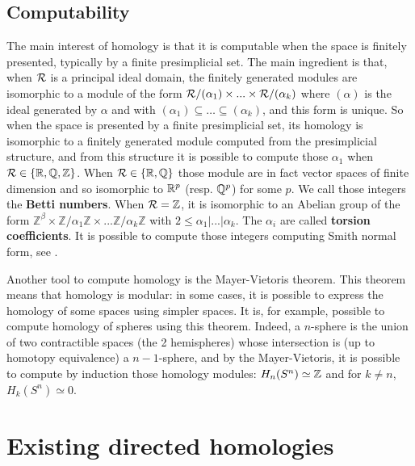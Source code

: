 \subsection{Computability}
\label{subsec:homcom}

The main interest of homology is that it is computable when the space is finitely presented, typically by a finite presimplicial set. The main ingredient is that, when $\mathcal{R}$ is a principal ideal domain, the finitely generated modules are isomorphic to a module of the form $\mathcal{R}/(\alpha_1)\times ... \times\mathcal{R}/(\alpha_k)$ where $(\alpha)$ is the ideal generated by $\alpha$ and with $(\alpha_1) \subseteq \ldots \subseteq (\alpha_k)$, and this form is unique. So when the space is presented by a finite presimplicial set, its homology is isomorphic to a finitely generated module computed from the presimplicial structure, and from this structure it is possible to compute those $\alpha_1$ when $\mathcal{R} \in \{\mathbb{R},\mathbb{Q},\mathbb{Z}\}$. When $\mathcal{R} \in \{\mathbb{R},\mathbb{Q}\}$ those module are in fact vector spaces of finite dimension and so isomorphic to $\mathbb{R}^p$ (resp. $\mathbb{Q}^p$) for some $p$. We call those integers the \textbf{Betti numbers}. When $\mathcal{R} = \mathbb{Z}$, it is isomorphic to an Abelian group of the form $\mathbb{Z}^\beta\times\mathbb{Z}/\alpha_1\mathbb{Z}\times ... \mathbb{Z}/\alpha_k\mathbb{Z}$ with $2 \leq \alpha_1|...|\alpha_k$. The $\alpha_i$ are called \textbf{torsion coefficients}. It is possible to compute those integers computing Smith normal form, see \cite{munkres30}. 

Another tool to compute homology is the Mayer-Vietoris theorem. This theorem means that homology is modular: in some cases, it is possible to express the homology of some spaces using simpler spaces. It is, for example, possible to compute homology of spheres using this theorem. Indeed, a $n$-sphere is the union of two contractible spaces (the 2 hemispheres) whose intersection is (up to homotopy equivalence) a $n-1$-sphere, and by the Mayer-Vietoris, it is possible to compute by induction those homology modules: $H_n(S^n) \simeq \mathbb{Z}$ and for $k \neq n$, $H_k(S^n) \simeq 0$.




\section{Existing directed homologies}
\label{sec:exidirhom}

